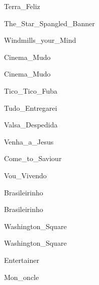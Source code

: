 \documentclass{scrartcl}
\begin{document}

{Terra_Feliz}


{The_Star_Spangled_Banner}


{Windmills_your_Mind}


{Cinema_Mudo}


{Cinema_Mudo}


{Tico_Tico_Fuba}


{Tudo_Entregarei}


{Valsa_Despedida}


{Venha_a_Jesus}


{Come_to_Saviour}


{Vou_Vivendo}


{Brasileirinho}


{Brasileirinho}


{Washington_Square}


{Washington_Square}


{Entertainer}


{Mon_oncle}
\end{document}
